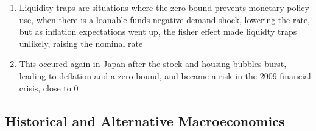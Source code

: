 \begin{enumerate}
\begin{enumerate}
\item Liquidity traps are situations where the zero bound prevents monetary policy use, when there is a loanable funds negative demand shock, lowering the rate, but as inflation expectations went up, the fisher effect made liquidty traps unlikely, raising the nominal rate
\item This occured again in Japan after the stock and housing bubbles burst, leading to deflation and a zero bound, and became a risk in the 2009 financial crisis, close to 0
\end{enumerate}
\end{enumerate}

\subsection{Historical and Alternative Macroeconomics}

